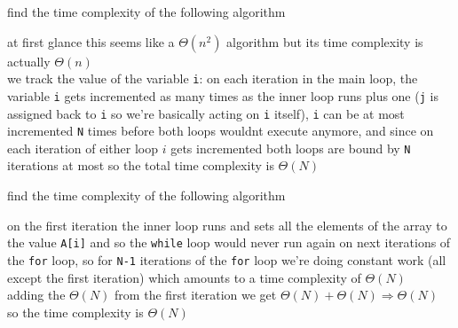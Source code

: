 \documentclass[a4paper,12pt]{article}
\begin{document}
\begin{question}
find the time complexity of the following algorithm\\
\begin{center}

\end{center}

\begin{answer}
at first glance this seems like a \(\Theta(n^2)\) algorithm but its time complexity is actually \(\Theta(n)\)\\
we track the value of the variable \texttt{i}: on each iteration in the main loop, the variable \texttt{i} gets incremented as many times as the inner loop runs plus one (\texttt{j} is assigned back to \texttt{i} so we're basically acting on \texttt{i} itself), \texttt{i} can be at most incremented \texttt{N} times before both loops wouldnt execute anymore, and since on each iteration of either loop \(i\) gets incremented both loops are bound by \texttt{N} iterations at most so the total time complexity is \(\Theta(N)\)\\
\end{answer}
\end{question}

\begin{question}
find the time complexity of the following algorithm\\
\begin{center}

\end{center}

on the first iteration the inner loop runs and sets all the elements of the array to the value \texttt{A[i]} and so the \texttt{while} loop would never run again on next iterations of the \texttt{for} loop, so for \texttt{N-1} iterations of the \texttt{for} loop we're doing constant work (all except the first iteration) which amounts to a time complexity of \(\Theta(N)\)\\
adding the \(\Theta(N)\) from the first iteration we get \(\Theta(N) + \Theta(N) \Rightarrow \Theta(N)\)\\
so the time complexity is \(\Theta(N)\)\\
\end{question}
\end{document}
